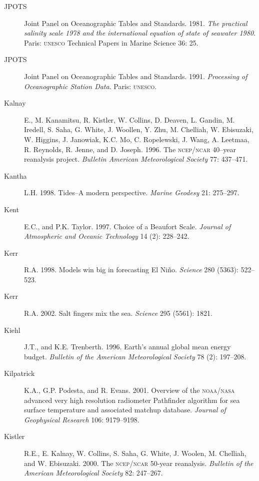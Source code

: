 \begin{description}
\item [JPOTS]Joint Panel on Oceanographic Tables and
  Standards. 1981. \textit{The practical salinity scale 1978 and the
    international equation of state of seawater 1980}. Paris:
  \textsc{unesco} Technical Papers in Marine Science 36: 25.
	
\item [JPOTS]Joint Panel on Oceanographic Tables and
  Standards. 1991. \textit{Processing of Oceanographic Station
    Data}. Paris: \textsc{unesco}.

\item [Kalnay]E., M. Kanamitsu, R. Kistler, W. Collins, D. Deaven,
  L. Gandin, M. Iredell, S. Saha, G. White, J. Woollen, Y. Zhu,
  M. Chelliah, W. Ebisuzaki, W.  Higgins, J. Janowiak, K.C. Mo,
  C. Ropelewski, J. Wang, A. Leetmaa, R. Reynolds, R. Jenne, and
  D. Joseph. 1996. The \textsc{ncep/ncar} 40--year reanalysis
  project. \textit{Bulletin American Meteorological Society} 77:
  437--471.

\item[Kantha]L.H. 1998. Tides--A modern perspective. \textit{Marine
  Geodesy} 21: 275--297.

\item [Kent]E.C., and P.K. Taylor. 1997. Choice of a Beaufort Scale.
  \textit{Journal of Atmospheric and Oceanic Technology} 14 (2):
  228--242.

\item[Kerr]R.A. 1998. Models win big in forecasting El
  Ni\~{n}o. \textit{Science} 280 (5363): 522--523.

\item [Kerr]R.A. 2002. Salt fingers mix the sea. \textit{Science} 295
  (5561): 1821.

\item [Kiehl]J.T., and K.E. Trenberth. 1996. Earth's annual global
  mean energy budget. \textit{Bulletin of the American Meteorological
    Society} 78 (2): 197--208.

\item [Kilpatrick]K.A., G.P. Podesta, and R. Evans. 2001. Overview of
  the \textsc{noaa/nasa} advanced very high resolution radiometer
  Pathfinder algorithm for sea surface temperature and associated
  matchup database. \textit{Journal of Geophysical Research} 106:
  9179--9198.

\item [Kistler]R.E., E. Kalnay, W. Collins, S. Saha, G. White,
  J. Woolen, M.  Chelliah, and W. Ebisuzaki. 2000. The
  \textsc{ncep/ncar} 50-year reanalysis.  \textit{Bulletin of the
    American Meteorological Society} 82: 247--267.


\end{description}
